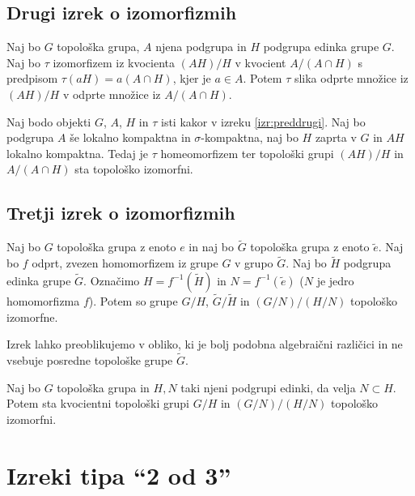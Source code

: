\documentclass[mat1]{fmfdelo}
\begin{document}
\subsection{Drugi izrek o izomorfizmih}
\begin{izrek}\label{izr:preddrugi}
Naj bo $G$ topološka grupa, $A$ njena podgrupa in $H$ podgrupa edinka grupe $G$. Naj bo $\tau$ izomorfizem iz kvocienta $(AH)/H$ v kvocient $A/(A \cap H)$ s predpisom $\tau (aH) = a(A \cap H)$, kjer je $a \in A$. Potem $\tau$ slika odprte množice iz $(AH)/H$ v odprte množice iz $A/(A \cap H)$.
\end{izrek}

\begin{izrek}\label{izr:drugitopizrek}
Naj bodo objekti $G$, $A$, $H$ in $\tau$ isti kakor v izreku \ref{izr:preddrugi}. Naj bo podgrupa $A$ še lokalno kompaktna in $\sigma$-kompaktna, naj bo $H$ zaprta v $G$ in $AH$ lokalno kompaktna. Tedaj je $\tau$ homeomorfizem ter topološki grupi $(AH)/H$ in $A/(A \cap H)$ sta topološko izomorfni.
\end{izrek}


\subsection{Tretji izrek o izomorfizmih}
\begin{izrek}\label{izr:predtretji}
Naj bo $G$ topološka grupa z enoto $e$ in naj bo $\widetilde{G}$ topološka grupa z enoto $\tilde{e}$. Naj bo $f$ odprt, zvezen homomorfizem iz grupe $G$ v grupo $\widetilde{G}$. Naj bo $\widetilde{H}$ podgrupa edinka grupe $\widetilde{G}$. Označimo $H = f^{-1}(\widetilde{H})$ in $N = f^{-1}(\tilde{e})$ ($N$ je jedro homomorfizma $f$). Potem so grupe $G/H$, $\widetilde{G}/\widetilde{H}$ in $(G/N)/(H/N)$ topološko izomorfne.
\end{izrek}

Izrek lahko preoblikujemo v obliko, ki je bolj podobna algebraični različici in ne vsebuje posredne topološke grupe $\widetilde{G}$.
\begin{izrek}\label{izr:tretjitopizrek}
Naj bo $G$ topološka grupa in $H,N$ taki njeni podgrupi edinki, da velja $N \subset H$. Potem sta kvocientni topološki grupi $G/H$ in $(G/N)/(H/N)$ topološko izomorfni.
\end{izrek}

\section{Izreki tipa ``2 od 3''}
\end{document}
